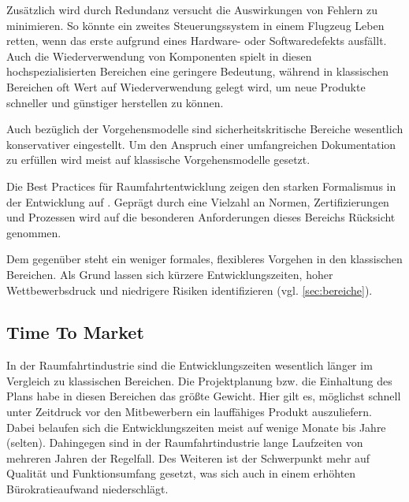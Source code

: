 Zusätzlich wird durch Redundanz versucht die Auswirkungen von Fehlern zu minimieren.
So könnte ein zweites Steuerungssystem in einem Flugzeug Leben retten, wenn das erste aufgrund eines Hardware- oder Softwaredefekts ausfällt.
Auch die Wiederverwendung von Komponenten spielt in diesen hochspezialisierten Bereichen eine geringere Bedeutung, während in klassischen Bereichen oft Wert auf Wiederverwendung gelegt wird, um neue Produkte schneller und günstiger herstellen zu können.
\parencite[Vgl.][S. 39]{Carpenter:2014aa}

Auch bezüglich der Vorgehensmodelle sind sicherheitskritische Bereiche wesentlich konservativer eingestellt.
Um den Anspruch einer umfangreichen Dokumentation zu erfüllen wird meist auf klassische Vorgehensmodelle gesetzt.
\parencite[Vgl.][S. 39]{Carpenter:2014aa}

Die Best Practices für Raumfahrtentwicklung zeigen den starken Formalismus in der Entwicklung auf \parencite[vgl.][S. 269ff]{Hersman:2010aa}.
Geprägt durch eine Vielzahl an Normen, Zertifizierungen und Prozessen wird auf die besonderen Anforderungen dieses Bereichs Rücksicht genommen.

Dem gegenüber steht ein weniger formales, flexibleres Vorgehen in den klassischen Bereichen. 
Als Grund lassen sich kürzere Entwicklungszeiten, hoher Wettbewerbsdruck und niedrigere Risiken identifizieren (vgl. \autoref{sec:bereiche}).


\subsection{Time To Market} %

In der Raumfahrtindustrie sind die Entwicklungszeiten wesentlich länger im Vergleich zu klassischen Bereichen.
Die Projektplanung bzw. die Einhaltung des Plans habe in diesen Bereichen das größte Gewicht. 
Hier gilt es, möglichst schnell unter Zeitdruck vor den Mitbewerbern ein lauffähiges Produkt auszuliefern.
Dabei belaufen sich die Entwicklungszeiten meist auf wenige Monate bis Jahre (selten).
Dahingegen sind in der Raumfahrtindustrie lange Laufzeiten von mehreren Jahren der Regelfall.
Des Weiteren ist der Schwerpunkt mehr auf Qualität und Funktionsumfang gesetzt, was sich auch in einem erhöhten Bürokratieaufwand niederschlägt.
\parencite[Vgl.][S. 97]{Dorfman:1999aa}


